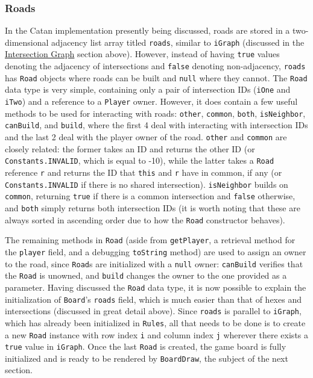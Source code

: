 \documentclass[pageno]{jpaper}
\begin{document}
\begin{doublespacing}
\subsubsection{Roads}

In the Catan implementation presently being discussed, roads are stored in a two-dimensional adjacency list array titled \lstinline$roads$, similar to \lstinline$iGraph$ (discussed in the \hyperlink{sec:intersection_graph}{Intersection Graph} section above). However, instead of having \lstinline$true$ values denoting the adjacency of intersections and \lstinline$false$ denoting non-adjacency, \lstinline$roads$ has \lstinline$Road$ objects where roads can be built and \lstinline$null$ where they cannot. The \lstinline$Road$ data type is very simple, containing only a pair of intersection IDs (\lstinline$iOne$ and \lstinline$iTwo$) and a reference to a \lstinline$Player$ owner. However, it does contain a few useful methods to be used for interacting with roads: \lstinline$other$, \lstinline$common$, \lstinline$both$, \lstinline$isNeighbor$, \lstinline$canBuild$, and \lstinline$build$, where the first 4 deal with interacting with intersection IDs and the last 2 deal with the player owner of the road. \lstinline$other$ and \lstinline$common$ are closely related: the former takes an ID and returns the other ID (or \lstinline$Constants.INVALID$, which is equal to -10), while the latter takes a \lstinline$Road$ reference \lstinline$r$ and returns the ID that \lstinline$this$ and \lstinline$r$ have in common, if any (or \lstinline$Constants.INVALID$ if there is no shared intersection). \lstinline$isNeighbor$ builds on \lstinline$common$, returning \lstinline$true$ if there is a common intersection and \lstinline$false$ otherwise, and \lstinline$both$ simply returns both intersection IDs (it is worth noting that these are always sorted in ascending order due to how the \lstinline$Road$ constructor behaves). 

The remaining methods in \lstinline$Road$ (aside from \lstinline$getPlayer$, a retrieval method for the \lstinline$player$ field, and a debugging \lstinline$toString$ method) are used to assign an owner to the road, since \lstinline$Road$s are initialized with a \lstinline$null$ owner: \lstinline$canBuild$ verifies that the \lstinline$Road$ is unowned, and \lstinline$build$ changes the owner to the one provided as a parameter. Having discussed the \lstinline$Road$ data type, it is now possible to explain the initialization of \lstinline$Board$'s \lstinline$roads$ field, which is much easier than that of hexes and intersections (discussed in great detail above). Since \lstinline$roads$ is parallel to \lstinline$iGraph$, which has already been initialized in \lstinline$Rules$, all that needs to be done is to create a new \lstinline$Road$ instance with row index \lstinline$i$ and column index \lstinline$j$ wherever there exists a \lstinline$true$ value in \lstinline$iGraph$. Once the last \lstinline$Road$ is created, the game board is fully initialized and is ready to be rendered by \lstinline$BoardDraw$, the subject of the next section.


\end{doublespacing}
\end{document}
